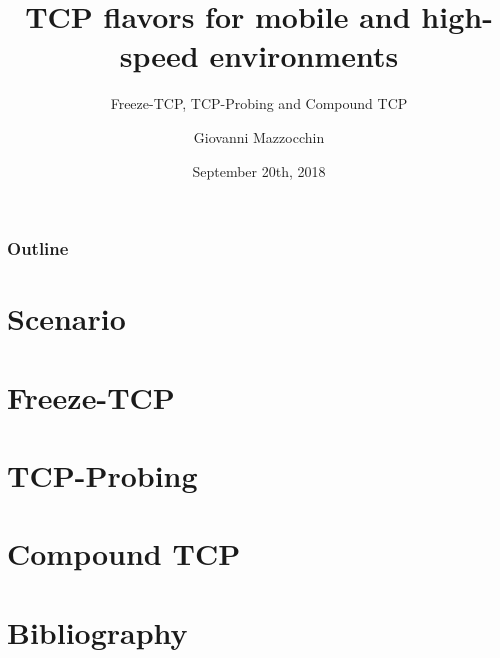 \documentclass{beamer}
\title{TCP flavors for mobile and high-speed environments}
\subtitle{\newline Freeze-TCP, TCP-Probing and Compound TCP}
\author{Giovanni Mazzocchin}
\date{September 20th, 2018}
\institute{Università degli Studi di Padova}
\begin{document}
\newcommand{\turnOffNumbers}{true} %

\begin{frame}[noframenumbering]
\titlepage
\end{frame}

\let\turnOffNumbers\empty
\begin{frame}
	\frametitle{Outline}
	\tableofcontents
\end{frame}

\section{Scenario}



\section{Freeze-TCP}









\section{TCP-Probing}









\section{Compound TCP}














\appendix
\section{Bibliography}

\makethanks
\end{document}
